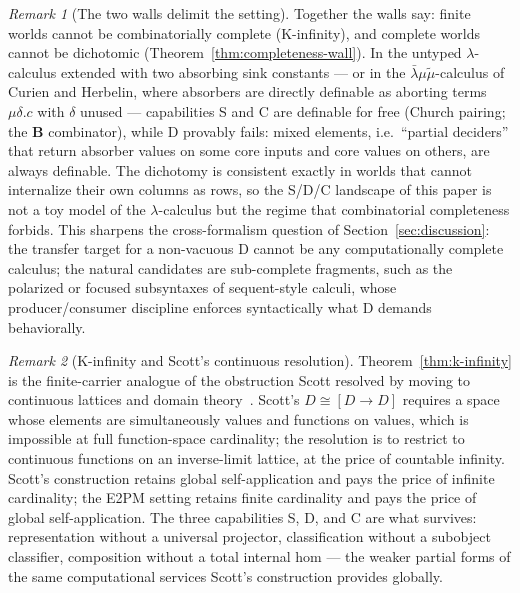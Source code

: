 \documentclass[sigconf,screen]{acmart}
\theoremstyle{remark}
\newtheorem{remark}{Remark}
\begin{document}
\begin{remark}[The two walls delimit the setting]
Together the walls say: finite worlds cannot be combinatorially complete (K-infinity), and complete worlds cannot be dichotomic (Theorem~\ref{thm:completeness-wall}). In the untyped $\lambda$-calculus extended with two absorbing sink constants --- or in the $\bar\lambda\mu\tilde\mu$-calculus of Curien and Herbelin, where absorbers are directly definable as aborting terms $\mu\delta.c$ with $\delta$ unused --- capabilities S and C are definable for free (Church pairing; the $\mathbf{B}$ combinator), while D provably fails: mixed elements, i.e.\ ``partial deciders'' that return absorber values on some core inputs and core values on others, are always definable. The dichotomy is consistent exactly in worlds that cannot internalize their own columns as rows, so the S/D/C landscape of this paper is not a toy model of the $\lambda$-calculus but the regime that combinatorial completeness forbids. This sharpens the cross-formalism question of Section~\ref{sec:discussion}: the transfer target for a non-vacuous D cannot be any computationally complete calculus; the natural candidates are sub-complete fragments, such as the polarized or focused subsyntaxes of sequent-style calculi, whose producer/consumer discipline enforces syntactically what D demands behaviorally.
\end{remark}

\begin{remark}[K-infinity and Scott's continuous resolution]
Theorem~\ref{thm:k-infinity} is the finite-carrier analogue of the obstruction Scott resolved by moving to continuous lattices and domain theory~\cite{scott72}. Scott's $D \cong [D \to D]$ requires a space whose elements are simultaneously values and functions on values, which is impossible at full function-space cardinality; the resolution is to restrict to continuous functions on an inverse-limit lattice, at the price of countable infinity. Scott's construction retains global self-application and pays the price of infinite cardinality; the E2PM setting retains finite cardinality and pays the price of global self-application. The three capabilities S, D, and C are what survives: representation without a universal projector, classification without a subobject classifier, composition without a total internal hom --- the weaker partial forms of the same computational services Scott's construction provides globally.
\end{remark}

\end{document}
